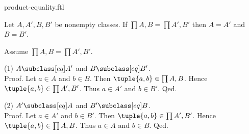 \documentclass{article}
\begin{document}
\begin{smodule}[creators={Marcel Schütz}]{product-equality.ftl}

  \begin{fproposition*}[label=2811898749779968]
    Let $A, A', B, B'$ be nonempty classes.
    If $\prod{A,B} = \prod{A',B'}$ then $A = A'$ and $B = B'$.
  \end{fproposition*}
  \begin{fproof}
    Assume $\prod{A,B} = \prod{A',B'}$.

    (1) $A \subclass[eq] A'$ and $B \subclass[eq] B'$. \\
    Proof.
      Let $a \in A$ and $b \in B$.
      Then $\tuple{a,b} \in \prod{A,B}$.
      Hence $\tuple{a,b} \in \prod{A',B'}$.
      Thus $a \in A'$ and $b \in B'$.
    Qed.

    (2) $A' \subclass[eq] A$ and $B' \subclass[eq] B$. \\
    Proof.
      Let $a \in A'$ and $b \in B'$.
      Then $\tuple{a,b} \in \prod{A',B'}$.
      Hence $\tuple{a,b} \in \prod{A,B}$.
      Thus $a \in A$ and $b \in B$.
    Qed.
  \end{fproof}
\end{smodule}
\end{document}
